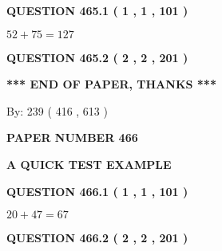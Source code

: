 \documentclass[12pt]{article}
\begin{document}
\vspace{0.2in}
  
{\textbf{\Large{QUESTION
465.1 
 ( 1 , 1 , 101 )
}}}
  
  
 
 

$ %
52 +  %
75=   %
127$
 
 
  
\vspace{0.2in}
  
{\textbf{\Large{QUESTION
465.2 
 ( 2 , 2 , 201 )
}}}
  
  
   
   
 \vspace{0.2in}
 
   
   
   
   
\vspace{1.0in} 
{\textbf{\large{ *** END OF PAPER, THANKS *** }}} 
   
   
\hspace{1.0in} By: 
 239 ( 416 ,  613 )
   
   
   
   
\newpage 
\setcounter{page}{ 
   466001 } 
   
   
   
   
 {\textbf{ \Large{ PAPER NUMBER  466  }}}
   
   
\vspace{0.2in}
   
   
   
   
   
   
 \vspace{0.2in}
{\LARGE {\textbf{ A QUICK TEST EXAMPLE}}}
   
   
  
\vspace{0.2in}
  
{\textbf{\Large{QUESTION
466.1 
 ( 1 , 1 , 101 )
}}}
  
  
 
 

$ %
20 +  %
47=   %
67$
 
 
  
\vspace{0.2in}
  
{\textbf{\Large{QUESTION
466.2 
 ( 2 , 2 , 201 )
}}}
  
  
   
   
 \vspace{0.2in}
 
\end{document}
